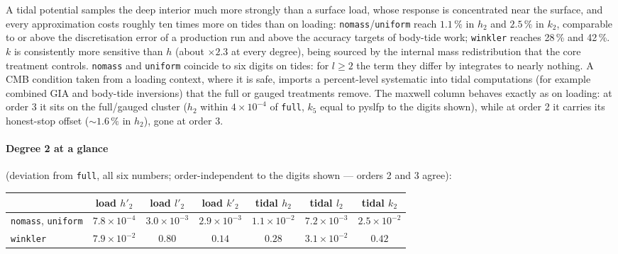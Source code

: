 \documentclass[11pt]{article}
\numberwithin{equation}{section}
\newcommand{\code}[1]{\texttt{#1}}
\begin{document}
A tidal potential samples the deep interior much more strongly than a
surface load, whose response is concentrated near the surface, and every
approximation costs roughly ten times more on tides than on loading:
\code{nomass}/\code{uniform} reach $1.1\,\%$ in $h_2$ and $2.5\,\%$ in $k_2$,
comparable to or above the discretisation error of a production run and
above the accuracy targets of body-tide work; \code{winkler} reaches 28\,\%
and 42\,\%. $k$ is consistently more sensitive than $h$ (about $\times2.3$
at every degree), being sourced by the internal mass redistribution that
the core treatment controls. \code{nomass} and \code{uniform} coincide to
six digits on tides: for $l\ge2$ the term they differ by integrates to
nearly nothing. A CMB condition taken from a loading context, where it is
safe, imports a percent-level systematic into tidal computations (for
example combined GIA and body-tide inversions) that the full or gauged
treatments remove. The maxwell column behaves exactly as on loading: at
order 3 it sits on the full/gauged cluster ($h_2$ within $4\times10^{-4}$
of \code{full}, $k_5$ equal to pyslfp to the digits shown), while at
order 2 it carries its honest-stop offset ($\sim1.6\,\%$ in $h_2$),
gone at order 3.

\paragraph{Degree 2 at a glance} (deviation from \code{full}, all six
numbers; order-independent to the digits shown --- orders 2 and 3
agree):
\begin{center}
\small
\begin{tabular}{@{}lcccccc@{}}
\toprule
 & load $h'_2$ & load $l'_2$ & load $k'_2$ & tidal $h_2$ & tidal $l_2$ & tidal $k_2$ \\
\midrule
\code{nomass}, \code{uniform} & $7.8\times10^{-4}$ & $3.0\times10^{-3}$ & $2.9\times10^{-3}$ & $1.1\times10^{-2}$ & $7.2\times10^{-3}$ & $2.5\times10^{-2}$ \\
\code{winkler} & $7.9\times10^{-2}$ & $0.80$ & $0.14$ & $0.28$ & $3.1\times10^{-2}$ & $0.42$ \\
\bottomrule
\end{tabular}
\end{center}
\end{document}
